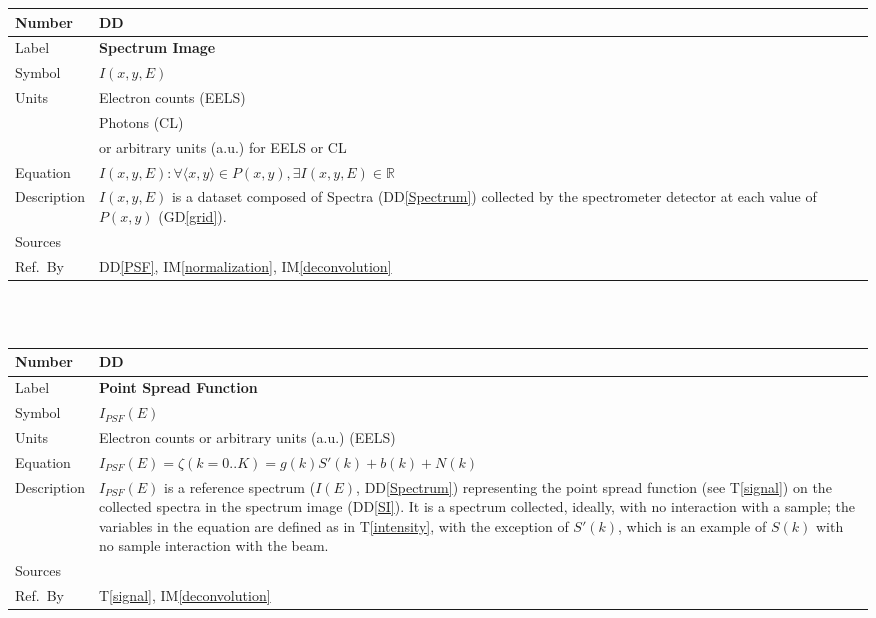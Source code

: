 \documentclass[12pt]{article}
\newcommand{\colAwidth}{0.13\textwidth}
\newcommand{\colBwidth}{0.82\textwidth}
\newcounter{defnum} %
\newcommand{\dref}[1]{GD\ref{#1}}
\newcounter{datadefnum} %
\newcommand{\ddref}[1]{DD\ref{#1}}
\newcommand{\tref}[1]{T\ref{#1}}
\newcommand{\iref}[1]{IM\ref{#1}}
\begin{document}
\noindent
\begin{minipage}{\textwidth}
\renewcommand*{\arraystretch}{1.5}
\begin{tabular}{| p{\colAwidth} | p{\colBwidth}|}
	\hline
	\rowcolor[gray]{0.9}
	Number& DD{datadefnum}\thedatadefnum \label{SI}\\
	\hline
	Label& \bf Spectrum Image\\
	\hline
	Symbol &$I(x, y, E)$\\
	\hline
	Units & Electron counts (EELS)\\
	& Photons (CL)\\
	& or arbitrary units (a.u.) for EELS or CL\\
	\hline
	Equation& $I(x, y, E): \forall \langle x, y \rangle \in P(x,y), \exists
I(x,y,E) \in \mathbb{R}$\\
	\hline
	Description & $I(x, y, E)$ is a dataset composed of Spectra (\ddref{Spectrum})
collected by the spectrometer detector at each value of $P(x,y)$ (\dref{grid}).
	\\
	\hline
	Sources&~\cite{jeanguillaume_spectrum-image:_1989}  \\
	\hline
	Ref.\ By & \ddref{PSF}, \iref{normalization}, \iref{deconvolution}\\
	\hline
\end{tabular}
\end{minipage}\\

~\newline

\noindent
\begin{minipage}{\textwidth}
	\renewcommand*{\arraystretch}{1.5}
	\begin{tabular}{| p{\colAwidth} | p{\colBwidth}|}
		\hline
		\rowcolor[gray]{0.9}
		Number& DD{datadefnum}\thedatadefnum \label{PSF}\\
		\hline
		Label& \bf Point Spread Function\\
		\hline
		Symbol &$I_{PSF}(E)$\\
		\hline
		Units & Electron counts or arbitrary units (a.u.) (EELS)\\
		  \hline
		  Equation&$I_{PSF}(E) = \zeta(k={0..K}) = g(k) S'(k) + b(k) + N(k)$\\
		  \hline
		  Description & $I_{PSF}(E)$ is a reference spectrum ($I(E)$,
\ddref{Spectrum}) representing the point spread function (see \tref{signal}) on
the collected spectra in the spectrum image (\ddref{SI}). It is a spectrum
collected, ideally, with no interaction with a sample; the variables in the
equation are defined as in \tref{intensity}, with the exception of $S'(k)$,
which is an example of $S(k)$ with no sample interaction with the beam.
		  \\
		  \hline
		  Sources&~\cite{zuo_electron_2000, jeanguillaume_spectrum-image:_1989,
gloter_improving_2003}  \\
		  \hline
		  Ref.\ By & \tref{signal}, \iref{deconvolution}\\
		  \hline
	\end{tabular}
\end{minipage}\\
\end{document}
